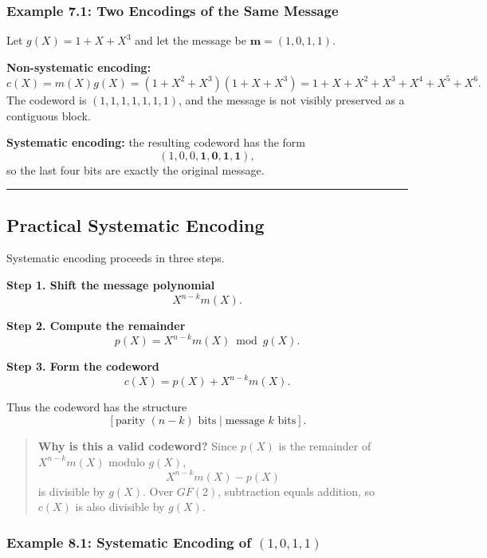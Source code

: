 \documentclass[
]{article}
\begin{document}
\subsubsection{Example 7.1: Two Encodings of the Same
Message}\label{example-7.1-two-encodings-of-the-same-message}

Let \(g(X)=1+X+X^3\) and let the message be \(\mathbf{m}=(1,0,1,1)\).

\textbf{Non-systematic encoding:}
\[c(X)=m(X)g(X)=(1+X^2+X^3)(1+X+X^3)=1+X+X^2+X^3+X^4+X^5+X^6.\] The
codeword is \((1,1,1,1,1,1,1)\), and the message is not visibly
preserved as a contiguous block.

\textbf{Systematic encoding:} the resulting codeword has the form
\[(1,0,0,\mathbf{1,0,1,1}),\] so the last four bits are exactly the
original message.

\begin{center}\rule{0.5\linewidth}{0.5pt}\end{center}

\subsection{Practical Systematic Encoding}\label{how-is-systematic-encoding-performed-in-practice}

Systematic encoding proceeds in three steps.

\textbf{Step 1. Shift the message polynomial} \[X^{n-k}m(X).\]

\textbf{Step 2. Compute the remainder} \[p(X)=X^{n-k}m(X) \bmod g(X).\]

\textbf{Step 3. Form the codeword} \[c(X)=p(X)+X^{n-k}m(X).\]

Thus the codeword has the structure
\[[\text{parity }(n-k)\text{ bits} \mid \text{message }k\text{ bits}].\]

\begin{quote}
\textbf{Why is this a valid codeword?} Since \(p(X)\) is the remainder
of \(X^{n-k}m(X)\) modulo \(g(X)\), \[X^{n-k}m(X)-p(X)\] is divisible by
\(g(X)\). Over \(GF(2)\), subtraction equals addition, so \(c(X)\) is
also divisible by \(g(X)\).
\end{quote}

\subsubsection{\texorpdfstring{Example 8.1: Systematic Encoding of
\((1,0,1,1)\)}{Example 8.1: Systematic Encoding of (1,0,1,1)}}\label{example-8.1-systematic-encoding-of-1011}
\end{document}

